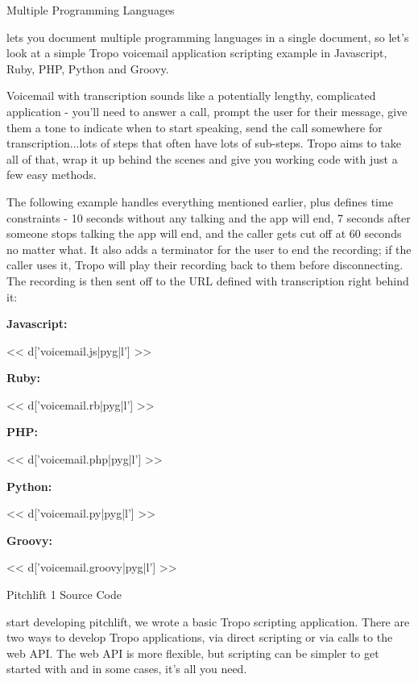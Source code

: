 \documentclass[custom, plainsections]{sciposter}
\begin{document}
\begin{multicols*}{2}
\small

\large
Multiple Programming Languages
\small

\vspace{5pt}

\label{sec:multiple-languages}
 lets you document multiple programming languages in a single document, so let's look at a simple Tropo voicemail application scripting example in Javascript, Ruby, PHP, Python and Groovy.

Voicemail with transcription sounds like a potentially lengthy, complicated application - you'll need to answer a call, prompt the user for their message, give them a tone to indicate when to start speaking, send the call somewhere for transcription...lots of steps that often have lots of sub-steps. Tropo aims to take all of that, wrap it up behind the scenes and give you working code with just a few easy methods.

The following example handles everything mentioned earlier, plus defines time constraints - 10 seconds without any talking and the app will end, 7 seconds after someone stops talking the app will end, and the caller gets cut off at 60 seconds no matter what. It also adds a terminator for the user to end the recording; if the caller uses it, Tropo will play their recording back to them before disconnecting. The recording is then sent off to the URL defined with transcription right behind it:

\vspace{10pt}

\textbf{Javascript:}

<< d['voicemail.js|pyg|l'] >>

\textbf{Ruby:}

<< d['voicemail.rb|pyg|l'] >>

\textbf{PHP:}

<< d['voicemail.php|pyg|l'] >>

\textbf{Python:}

<< d['voicemail.py|pyg|l'] >>

\textbf{Groovy:}

<< d['voicemail.groovy|pyg|l'] >>

\large
Pitchlift 1 Source Code
\small

\label{sec:pitchlift-1}

\vspace{5pt}

 start developing pitchlift, we wrote a basic Tropo scripting application. There are two ways to develop Tropo applications, via direct scripting or via calls to the web API. The web API is more flexible, but scripting can be simpler to get started with and in some cases, it's all you need.


\end{multicols*}
\end{document}
